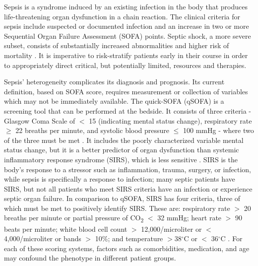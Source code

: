 
Sepsis is a syndrome induced by an existing infection in the body that produces life-threatening organ dysfunction in a chain reaction. The clinical criteria for sepsis include suspected or documented infection and an increase in two or more Sequential Organ Failure Assessment (SOFA) points. Septic shock, a more severe subset, consists of substantially increased abnormalities \autocite{sepsis-3} and higher risk of mortality \autocite{paoli_epidemiology_2018}. It is imperative to risk-stratify patients early in their course in order to appropriately direct critical, but potentially limited, resources and therapies.

Sepsis' heterogeneity complicates its diagnosis and prognosis. Its current definition, based on SOFA score, requires measurement or collection of variables which may not be immediately available. The quick-SOFA (qSOFA) is a screening tool that can be performed at the bedside. It consists of three criteria - Glasgow Coma Scale of $<$ 15 (indicating mental status change), respiratory rate $\geq$ 22 breaths per minute, and systolic blood pressure $\leq$ 100 mmHg - where two of the three must be met \autocite{sepsis-3}. It includes the poorly characterized variable mental status change, but it is a better predictor of organ dysfunction than systemic inflammatory response syndrome (SIRS), which is less sensitive \autocite{sirs_1992, seymour_assessment_2016}. SIRS is the body's response to a stressor such as inflammation, trauma, surgery, or infection, while sepsis is specifically a response to infection; many septic patients have SIRS, but not all patients who meet SIRS criteria have an infection or experience septic organ failure. In comparison to qSOFA, SIRS has four criteria, three of which must be met to positively identify SIRS. These are: respiratory rate $>$ 20 breaths per minute or partial pressure of CO\textsubscript{2} $<$ 32 mmHg; heart rate $>$ 90 beats per minute; white blood cell count $>$ 12,000/microliter or $<$ 4,000/microliter or bands $>$ 10\%; and temperature $>$38$^{\circ}$C or $<$ 36$^{\circ}$C \autocite{sirs_chakraborty_systemic_2022}. For each of these scoring systems, factors such as comorbidities, medication, and age may confound the phenotype in different patient groups.

